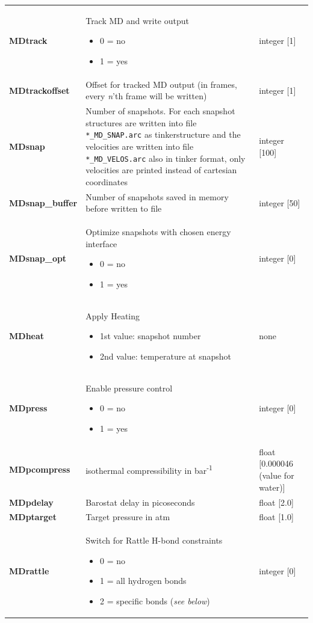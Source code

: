 \documentclass[10pt,a4paper]{article} %
\begin{document}
\begin{longtable}{|p{4cm}|p{4.5cm}|p{3cm}|}
		\textbf{MDtrack} & Track MD and write output\begin{itemize} \item 0 = no \item 1 = yes\end{itemize}& integer [1] \\
		\textbf{MDtrackoffset} & Offset for tracked MD output (in frames, every \textit{n}'th frame will be written)& integer [1] \\
		\textbf{MDsnap} & Number of snapshots. For each snapshot structures are written into file \texttt{*\_MD\_SNAP.arc} as tinkerstructure and the velocities are written into file \texttt{*\_MD\_VELOS.arc} also in tinker format, only velocities are printed instead of cartesian coordinates & integer [100] \\
		\textbf{MDsnap\_buffer} & Number of snapshots saved in memory before written to file & integer [50] \\
		\textbf{MDsnap\_opt} & Optimize snapshots with chosen energy interface\begin{itemize} \item 0 = no \item 1 = yes\end{itemize} & integer [0] \\
		\textbf{MDheat}  & Apply Heating \begin{itemize}\item1st value: snapshot number\item2nd value: temperature at snapshot\end{itemize} & none\\
		\textbf{MDpress} & Enable pressure control\begin{itemize} \item 0 = no \item 1 = yes\end{itemize}& integer [0]\\
		\textbf{MDpcompress} & isothermal compressibility in bar\textsuperscript{-1} & float [0.000046 (value for water)] \\ 
		\textbf{MDpdelay} & Barostat delay in picoseconds & float [2.0]\\
		\textbf{MDptarget} & Target pressure in atm & float [1.0] \\
		\textbf{MDrattle} & Switch for Rattle\supercite{rattle} H-bond constraints\begin{itemize} \item 0 = no \item 1 = all hydrogen bonds \item 2 = specific bonds (\textit{see below}) \end{itemize} & integer [0] \\

\end{longtable}
\end{document}
